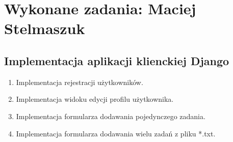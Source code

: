 \documentclass[a4paper,10pt]{article}
\begin{document}
\section{Wykonane zadania: Maciej Stelmaszuk}

\subsection{Implementacja aplikacji klienckiej Django}

\begin{enumerate}
	\item Implementacja rejestracji użytkowników.
	\item Implementacja widoku edycji profilu użytkownika.
	\item Implementacja formularza dodawania pojedynczego zadania.
	\item Implementacja formularza dodawania wielu zadań z pliku *.txt.
\end{enumerate}
\end{document}

